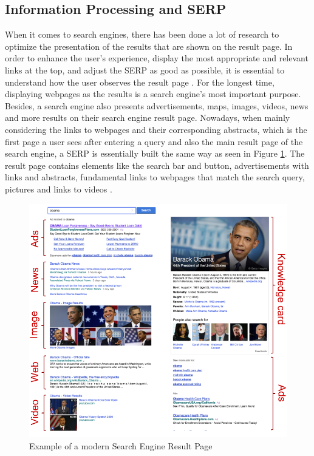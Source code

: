 \subsection{Information Processing and SERP}
\label{subsection:ReadingSERP}
When it comes to search engines, there has been done a lot of research to optimize the presentation of the results that are shown on the result page.  In order to enhance the user's experience, display the most appropriate and relevant links at the top, and adjust the SERP as good as possible, it is essential to understand how the user observes the result page \autocite{buscher2010good, liu2015influence}.
For the longest time, displaying webpages as the results is a search engine's most important purpose. Besides, a search engine also presents advertisements, maps, images, videos, news and more results on their search engine result page. Nowadays, when mainly considering the links to webpages and their corresponding abstracts, which is the first page a user sees after entering a query and also the main result page of the search engine, a SERP is essentially built the same way as seen in Figure \ref{figure:ModernSerp}.
The result page contains elements like the search bar and button, advertisements with links and abstracts, fundamental links to webpages that match the search query, pictures and links to videos \autocite{wang2016beyond}.

\begin{figure}[!ht]
    \centering
    \includegraphics[width=1\linewidth]{images/SERP_wang2016beyond.png}
    \caption{
        Example of a modern Search Engine Result Page \autocite[2]{wang2016beyond}
    }
    \label{figure:ModernSerp}
\end{figure}

